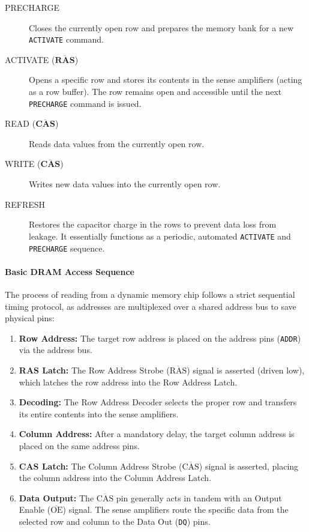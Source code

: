 \begin{description}
    \item[PRECHARGE] Closes the currently open row and prepares the memory bank for a new \texttt{ACTIVATE} command.
    \item[ACTIVATE (\(\overline{\textbf{RAS}}\))] Opens a specific row and stores its contents in the sense amplifiers (acting as a row buffer). The row remains open and accessible until the next \texttt{PRECHARGE} command is issued.
    \item[READ (\(\overline{\textbf{CAS}}\))] Reads data values from the currently open row.
    \item[WRITE (\(\overline{\textbf{CAS}}\))] Writes new data values into the currently open row.
    \item[REFRESH] Restores the capacitor charge in the rows to prevent data loss from leakage. It essentially functions as a periodic, automated \texttt{ACTIVATE} and \texttt{PRECHARGE} sequence.
\end{description}

\paragraph{Basic DRAM Access Sequence}
The process of reading from a dynamic memory chip follows a strict sequential timing protocol, as addresses are multiplexed over a shared address bus to save physical pins:

\begin{enumerate}
    \item \textbf{Row Address:} The target row address is placed on the address pins (\texttt{ADDR}) via the address bus.
    \item \textbf{RAS Latch:} The Row Address Strobe (\(\overline{\text{RAS}}\)) signal is asserted (driven low), which latches the row address into the Row Address Latch.
    \item \textbf{Decoding:} The Row Address Decoder selects the proper row and transfers its entire contents into the sense amplifiers.
    \item \textbf{Column Address:} After a mandatory delay, the target column address is placed on the same address pins.
    \item \textbf{CAS Latch:} The Column Address Strobe (\(\overline{\text{CAS}}\)) signal is asserted, placing the column address into the Column Address Latch.
    \item \textbf{Data Output:} The \(\overline{\text{CAS}}\) pin generally acts in tandem with an Output Enable (\(\overline{\text{OE}}\)) signal. The sense amplifiers route the specific data from the selected row and column to the Data Out (\texttt{DQ}) pins.
\end{enumerate}

